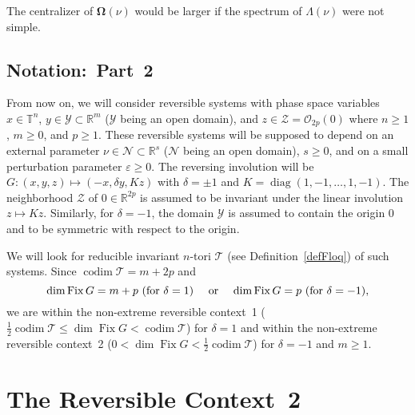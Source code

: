 \documentclass[12pt,reqno]{amsart}
\theoremstyle{definition}
\begin{document}
The centralizer of ${\mathbf{\Omega}}(\nu)$ would be larger if the spectrum of
$\Lambda(\nu)$ were not simple.

\subsection{Notation:\ Part~2}\label{nota2}

From now on, we will consider reversible systems with phase space variables
$x\in{\mathbb T}^n$, $y\in{\mathcal Y}\subset{\mathbb R}^m$ (${\mathcal Y}$ being an open domain), and
$z\in{\mathcal Z}={\mathcal O}_{2p}(0)$ where $n{\geqslant} 1$, $m{\geqslant} 0$, and $p{\geqslant} 1$. These
reversible systems will be supposed to depend on an external parameter
$\nu\in{\mathcal N}\subset{\mathbb R}^s$ (${\mathcal N}$ being an open domain), $s{\geqslant} 0$, and on a
small perturbation parameter ${\varepsilon}{\geqslant} 0$. The reversing involution will be
$G:(x,y,z)\mapsto(-x,\delta y,Kz)$ with $\delta=\pm 1$ and
$K=\operatorname{diag}(1,-1,\ldots,1,-1)$. The neighborhood ${\mathcal Z}$ of $0\in{\mathbb R}^{2p}$ is
assumed to be invariant under the linear involution $z\mapsto Kz$. Similarly,
for $\delta=-1$, the domain ${\mathcal Y}$ is assumed to contain the origin $0$ and to
be symmetric with respect to the origin.

We will look for reducible invariant $n$-tori ${\mathcal T}$ (see
Definition~\ref{defFloq}) of such systems. Since $\operatorname{codim}{\mathcal T}=m+2p$ and
\[
\text{$\dim\operatorname{Fix} G=m+p$ (for $\delta=1$) \quad or \quad
$\dim\operatorname{Fix} G=p$ (for $\delta=-1$)},
\]
we are within the non-extreme reversible context~1
($\frac{1}{2}\operatorname{codim}{\mathcal T}{\leqslant}\dim\operatorname{Fix} G<\operatorname{codim}{\mathcal T}$) for $\delta=1$ and within the
non-extreme reversible context~2 ($0<\dim\operatorname{Fix} G<\frac{1}{2}\operatorname{codim}{\mathcal T}$) for
$\delta=-1$ and $m{\geqslant} 1$.

\section{The Reversible Context~2}\label{cont2}
\end{document}

